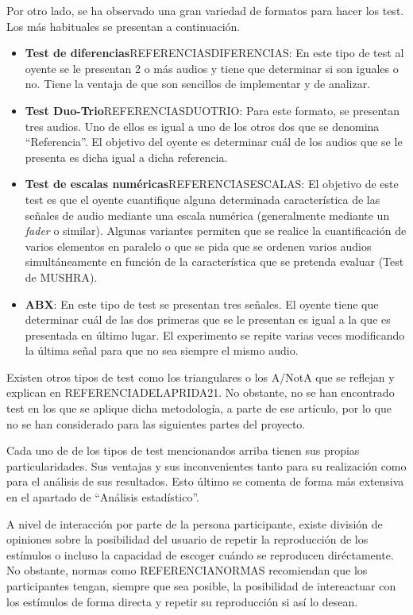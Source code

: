 \documentclass[11pt,a4paper]{book}
\begin{document}
    Por otro lado, se ha observado una gran variedad de formatos para hacer los test. Los más habituales se presentan a continuación.
    
    \begin{itemize}
        \item \textbf{Test de diferencias}REFERENCIASDIFERENCIAS: En este tipo de test al oyente se le presentan 2 o más audios y tiene que determinar si son iguales o no. Tiene la ventaja de que son sencillos de implementar y de analizar.
        \item \textbf{Test Duo-Trio}REFERENCIASDUOTRIO: Para este formato, se presentan tres audios. Uno de ellos es igual a  uno de los otros dos que se denomina ``Referencia''. El objetivo del oyente es determinar cuál de los audios que se le presenta es dicha igual a dicha referencia.
        \item \textbf{Test de escalas numéricas}REFERENCIASESCALAS: El objetivo de este test es que el oyente cuantifique alguna determinada característica de las señales de audio mediante una escala numérica (generalmente mediante un \textit{fader} o similar). Algunas variantes permiten que se realice la cuantificación de varios elementos en paralelo o que se pida que se ordenen varios audios simultáneamente en función de la característica que se pretenda evaluar (Test de MUSHRA).
        \item \textbf{ABX}: En este tipo de test se presentan tres señales. El oyente tiene que determinar cuál de las dos primeras que se le presentan es igual a la que es presentada en último lugar. El experimento se repite varias veces modificando la última señal para que no sea siempre el mismo audio. 
    \end{itemize}
    Existen otros tipos de test como los triangulares o los A/NotA que se reflejan y explican en REFERENCIADELAPRIDA21. No obstante, no se han encontrado test en los que se aplique dicha metodología, a parte de ese artículo, por lo que no se han considerado para las siguientes partes del proyecto.
    
    Cada uno de de los tipos de test mencionandos arriba tienen sus propias particularidades. Sus ventajas y sus inconvenientes tanto para su realización como para el análisis de sus resultados. Esto último se comenta de forma más extensiva en el apartado de ``Análisis estadístico''. 
    
    A nivel de interacción por parte de la persona participante, existe división de opiniones sobre la posibilidad del usuario de repetir la reproducción de los estímulos o incluso la capacidad de escoger cuándo se reproducen diréctamente. No obstante, normas como REFERENCIANORMAS recomiendan que los participantes tengan, siempre que sea posible, la posibilidad de intereactuar con los estímulos de forma directa y repetir su reproducción si así lo desean.
    
\end{document}
